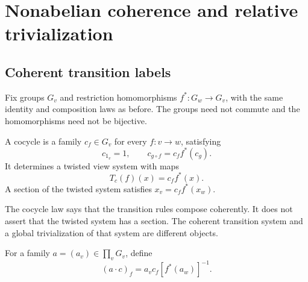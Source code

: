 \section{Nonabelian coherence and relative trivialization}\label{sec:gauge}
\subsection{Coherent transition labels}
Fix groups \(G_v\) and restriction homomorphisms \(f^*:G_w\to G_v\), with the same identity and composition laws as before. The groups need not commute and the homomorphisms need not be bijective.

\begin{definition}[Cocycle]
A cocycle is a family \(c_f\in G_v\) for every \(f:v\to w\), satisfying
\[
 c_{1_v}=1,\qquad c_{g\circ f}=c_f f^*(c_g).
\]
It determines a twisted view system with maps
\[
 T_c(f)(x)=c_f f^*(x).
\]
A section of the twisted system satisfies \(x_v=c_f f^*(x_w)\).
\end{definition}
The cocycle law says that the transition rules compose coherently. It does not assert that the twisted system has a section. The coherent transition system and a global trivialization of that system are different objects.

For a family \(a=(a_v)\in\prod_vG_v\), define
\begin{equation}\label{eq:gauge}
 (a\cdot c)_f=a_vc_f[f^*(a_w)]^{-1}.
\end{equation}

